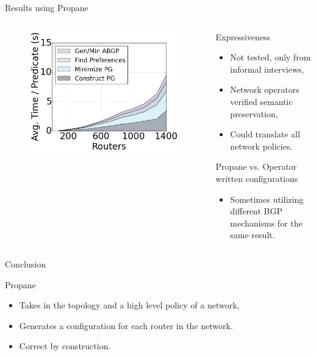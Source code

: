 \begin{frame}{Results using Propane}
    \begin{columns}
        \begin{column}{0.45\textwidth}
            \begin{figure}
                \includegraphics[width=0.66\columnwidth,keepaspectratio]{figures/compilation-times-dc}
            \end{figure}
        \end{column}
        \begin{column}{0.50\textwidth}
            \begin{block}{Expressiveness}
                \begin{itemize}
                    \item Not tested, only from informal interviews,
                    \item Network operators verified semantic preservation,
                    \item Could translate all network policies.
                \end{itemize}
            \end{block}
            \begin{block}{Propane vs. Operator written configurations}
                \begin{itemize}
                    \item Sometimes utilizing different BGP mechanisms for the same result.
                \end{itemize}
            \end{block}
        \end{column}
    \end{columns}
\end{frame}

\begin{frame}{Conclusion}
    \begin{block}{Propane}
        \begin{itemize}
            \item Takes in the topology and a high level policy of a network,
            \item Generates a configuration for each router in the network.
            \item Correct by construction.
        \end{itemize}
    \end{block}
\end{frame}
